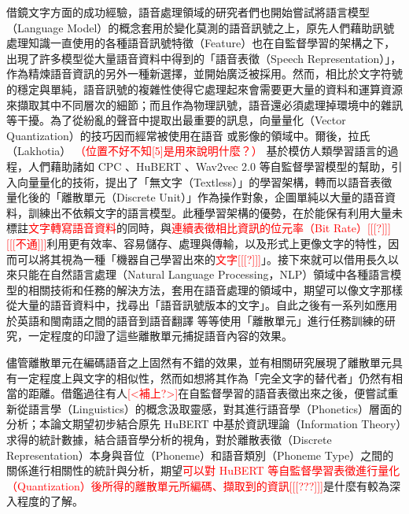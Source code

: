         借鏡文字方面的成功經驗，語音處理領域的研究者們也開始嘗試將語言模型（Language Model）的概念套用於變化莫測的語音訊號之上，原先人們藉助訊號處理知識一直使用的各種語音訊號特徵（Feature）也在自監督學習的架構之下，出現了許多模型從大量語音資料中得到的「語音表徵（Speech Representation）」，作為精煉語音資訊的另外一種新選擇，並開始廣泛被採用。然而，相比於文字符號的穩定與單純，語音訊號的複雜性使得它處理起來會需要更大量的資料和運算資源來擷取其中不同層次的細節；而且作為物理訊號，語音還必須處理掉環境中的雜訊等干擾。為了從紛亂的聲音中提取出最重要的訊息，向量量化（Vector Quantization）的技巧因而經常被使用在語音 \cite{chorowski_unsupervised_2019,chen_vector_2023,zhao_speech_2023} 或影像的領域中。爾後，拉氏（Lakhotia） \cite{lakhotia_generative_2021-1} \textcolor{red}{（位置不好不知[5]是用來說明什麼？）} 基於模仿人類學習語言的過程，人們藉助諸如 CPC \cite{oord_representation_2019}、HuBERT \cite{hsu_hubert_2021}、Wav2vec 2.0 \cite{baevski_wav2vec_2020} 等自監督學習模型的幫助，引入向量量化的技術，提出了「無文字（Textless）」的學習架構，轉而以語音表徵量化後的「離散單元（Discrete Unit）」作為操作對象，企圖單純以大量的語音資料，訓練出不依賴文字的語言模型。此種學習架構的優勢，在於能保有利用大量未標註\textcolor{red}{文字轉寫語音資料}的同時，與\textcolor{red}{連續表徵相比資訊的位元率（Bit Rate）[[[?]]][[[不通]]]}利用更有效率、容易儲存、處理與傳輸，以及形式上更像文字的特性，因而可以將其視為一種「機器自己學習出來的\textcolor{red}{文字[[[?]]]}」。接下來就可以借用長久以來只能在自然語言處理（Natural Language Processing，NLP）領域中各種語言模型的相關技術和任務的解決方法，套用在語音處理的領域中，期望可以像文字那樣從大量的語音資料中，找尋出「語音訊號版本的文字」。自此之後有一系列如應用於英語和閩南語之間的語音到語音翻譯 \cite{chen_speech--speech_2023} 等等使用「離散單元」進行任務訓練的研究，一定程度的印證了這些離散單元捕捉語音內容的效果。

        儘管離散單元在編碼語音之上固然有不錯的效果，並有相關研究展現了離散單元具有一定程度上與文字的相似性，然而如想將其作為「完全文字的替代者」仍然有相當的距離。借鑑過往有人\textcolor{red}{[<補上?>]}在自監督學習的語音表徵出來之後，便嘗試重新從語言學（Linguistics）的概念汲取靈感，對其進行語音學（Phonetics）層面的分析；本論文期望初步結合原先 HuBERT 中基於資訊理論（Information Theory）求得的統計數據，結合語音學分析的視角，對於離散表徵（Discrete Representation）本身與音位（Phoneme）和語音類別（Phoneme Type）之間的關係進行相關性的統計與分析，期望\textcolor{red}{可以對 HuBERT 等自監督學習表徵進行量化（Quantization）後所得的離散單元所編碼、擷取到的資訊[[[???]]]}是什麼有較為深入程度的了解。

